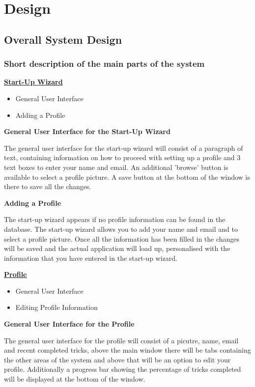 \chapter{Design}

\section{Overall System Design}

\subsection{Short description of the main parts of the system}

\underline{\textbf{Start-Up Wizard}}
\begin{itemize}
\item General User Interface
\item Adding a Profile
\end{itemize}

\textbf{General User Interface for the Start-Up Wizard}

The general user interface for the start-up wizard will consist of a paragraph of text, containing information on how to proceed with setting up a profile and 3 text boxes to enter your name and email. An additional 'browse' button is available to select a profile picture. A save button at the bottom of the window is there to save all the changes.

\textbf{Adding a Profile}

The start-up wizard appears if no profile information can be found in the database. The start-up wizard allows you to add your name and email and to select a profile picture. Once all the information has been filled in the changes will be saved and the actual application will load up, personalised with the information that you have entered in the start-up wizard. 

\underline{\textbf{Profile}}
\begin{itemize}
\item General User Interface
\item Editing Profile Information
\end{itemize}

\textbf{General User Interface for the Profile}

The general user interface for the profile will consist of a picutre, name, email and recent completed tricks, above the main window there will be tabs containing the other areas of the system and above that will be an option to edit your profile. Additionally a progress bar showing the percentage of tricks completed will be displayed at the bottom of the window. 

